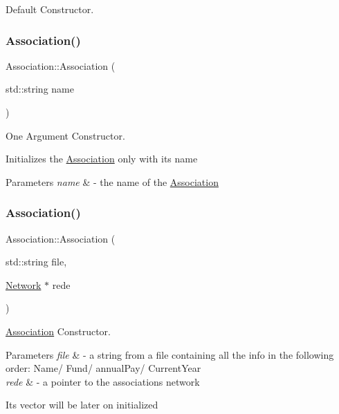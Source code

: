 Default Constructor. 

\mbox{\label{classAssociation_a0773254cf0a1377e144a39b36c99d74d}} 
\subsubsection{\texorpdfstring{Association()}{Association()}\hspace{0.1cm}{\footnotesize\ttfamily [2/3]}}
{\footnotesize\ttfamily Association\+::\+Association (\begin{DoxyParamCaption}\item[{std\+::string}]{name }\end{DoxyParamCaption})}



One Argument Constructor. 

Initializes the \hyperlink{classAssociation}{Association} only with it\textquotesingle{}s name


\begin{DoxyParams}{Parameters}
{\em name} & -\/ the name of the \hyperlink{classAssociation}{Association} \\
\hline
\end{DoxyParams}
\mbox{\label{classAssociation_aaf75146fc564138ae2ae2430eb7926a2}} 
\subsubsection{\texorpdfstring{Association()}{Association()}\hspace{0.1cm}{\footnotesize\ttfamily [3/3]}}
{\footnotesize\ttfamily Association\+::\+Association (\begin{DoxyParamCaption}\item[{std\+::string}]{file,  }\item[{\hyperlink{classNetwork}{Network} $\ast$}]{rede }\end{DoxyParamCaption})}



\hyperlink{classAssociation}{Association} Constructor. 


\begin{DoxyParams}{Parameters}
{\em file} & -\/ a string from a file containing all the info in the following order\+: Name/ Fund/ annual\+Pay/ Current\+Year \\
\hline
{\em rede} & -\/ a pointer to the association\textquotesingle{}s network\\
\hline
\end{DoxyParams}
It\textquotesingle{}s vector will be later on initialized \mbox{\label{classAssociation_adc0ad6a21b904d08c1d392550df9da59}} 
